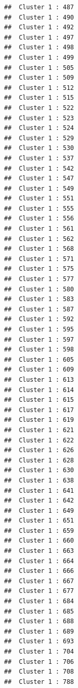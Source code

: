 \documentclass[
  a4paper,
]{article}
\begin{document}
\begin{verbatim}
##  Cluster 1 : 487 
##  Cluster 1 : 490 
##  Cluster 1 : 492 
##  Cluster 1 : 497 
##  Cluster 1 : 498 
##  Cluster 1 : 499 
##  Cluster 1 : 505 
##  Cluster 1 : 509 
##  Cluster 1 : 512 
##  Cluster 1 : 515 
##  Cluster 1 : 522 
##  Cluster 1 : 523 
##  Cluster 1 : 524 
##  Cluster 1 : 529 
##  Cluster 1 : 530 
##  Cluster 1 : 537 
##  Cluster 1 : 542 
##  Cluster 1 : 547 
##  Cluster 1 : 549 
##  Cluster 1 : 551 
##  Cluster 1 : 555 
##  Cluster 1 : 556 
##  Cluster 1 : 561 
##  Cluster 1 : 562 
##  Cluster 1 : 568 
##  Cluster 1 : 571 
##  Cluster 1 : 575 
##  Cluster 1 : 577 
##  Cluster 1 : 580 
##  Cluster 1 : 583 
##  Cluster 1 : 587 
##  Cluster 1 : 592 
##  Cluster 1 : 595 
##  Cluster 1 : 597 
##  Cluster 1 : 598 
##  Cluster 1 : 605 
##  Cluster 1 : 609 
##  Cluster 1 : 613 
##  Cluster 1 : 614 
##  Cluster 1 : 615 
##  Cluster 1 : 617 
##  Cluster 1 : 619 
##  Cluster 1 : 621 
##  Cluster 1 : 622 
##  Cluster 1 : 626 
##  Cluster 1 : 628 
##  Cluster 1 : 630 
##  Cluster 1 : 638 
##  Cluster 1 : 641 
##  Cluster 1 : 642 
##  Cluster 1 : 649 
##  Cluster 1 : 651 
##  Cluster 1 : 659 
##  Cluster 1 : 660 
##  Cluster 1 : 663 
##  Cluster 1 : 664 
##  Cluster 1 : 666 
##  Cluster 1 : 667 
##  Cluster 1 : 677 
##  Cluster 1 : 684 
##  Cluster 1 : 685 
##  Cluster 1 : 688 
##  Cluster 1 : 689 
##  Cluster 1 : 693 
##  Cluster 1 : 704 
##  Cluster 1 : 706 
##  Cluster 1 : 708 
##  Cluster 1 : 788
\end{verbatim}
\end{document}
